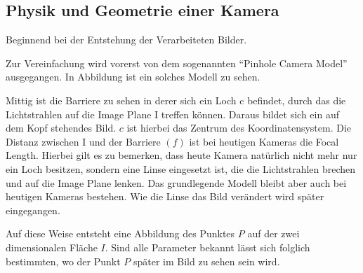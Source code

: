 \subsection{Physik und Geometrie einer Kamera}
\label{sec:camerageo}
Beginnend bei der Entstehung der Verarbeiteten Bilder. 

Zur Vereinfachung wird vorerst von dem sogenannten "`Pinhole Camera Model"' ausgegangen. In Abbildung  ist ein solches Modell zu sehen. 

Mittig ist die Barriere zu sehen in derer sich ein Loch c befindet, durch das die Lichtstrahlen auf die Image Plane I treffen können. Daraus bildet sich ein auf dem Kopf stehendes Bild. $c$ ist hierbei das Zentrum des Koordinatensystem.
Die Distanz zwischen I und der Barriere $(f)$ ist bei heutigen Kameras die Focal Length. Hierbei gilt es zu bemerken, dass heute Kamera natürlich nicht mehr nur ein Loch besitzen, sondern eine Linse eingesetzt ist, die die Lichtstrahlen brechen und auf die Image Plane lenken. Das grundlegende Modell bleibt aber auch bei heutigen Kameras bestehen. Wie die Linse das Bild verändert wird später eingegangen. 

Auf diese Weise entsteht eine Abbildung des Punktes $P$ auf der zwei dimensionalen Fläche $I$. Sind alle Parameter bekannt lässt sich folglich bestimmten, wo der Punkt $P$ später im Bild zu sehen sein wird. 

